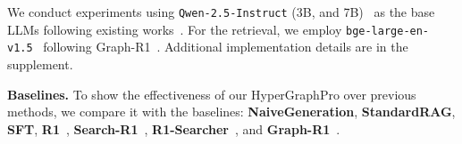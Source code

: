 We conduct experiments using \texttt{Qwen-2.5-Instruct} (3B, and 7B)~\citep{qwen2025qwen25technicalreport} as the base LLMs following existing works~\citep{luo2025graph}.
For the retrieval, we employ \texttt{bge-large-en-v1.5}~\citep{xiao2024cpackpackedresourcesgeneral} following Graph-R1~\citep{luo2025graph}.
Additional implementation details are in the supplement.

\noindent\textbf{Baselines.}
To show the effectiveness of our HyperGraphPro over previous methods, we compare it with the baselines: \textbf{NaiveGeneration}, \textbf{StandardRAG}, \textbf{SFT}, \textbf{R1}~\citep{shao2024deepseekmath}, \textbf{Search-R1}~\citep{jin2025search}, \textbf{R1-Searcher}~\citep{song2025r1}, and \textbf{Graph-R1}~\citep{luo2025graph}.